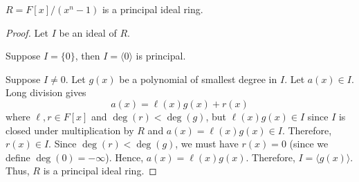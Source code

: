 \begin{thmbox}
    \begin{theorem}
        $ R=F[x]/(x^n-1) $ is a principal ideal ring.
    \end{theorem}
\end{thmbox}

\begin{proof}
    Let $ I $ be an ideal of $ R $.

    Suppose $ I=\{0\} $, then $ I=\langle 0\rangle $ is principal.

    Suppose $ I\neq 0 $. Let $ g(x) $ be a polynomial of smallest
    degree in $ I $. Let $ a(x)\in I $. Long division
    gives
    \[ a(x)=\ell(x)g(x)+r(x) \]
    where $ \ell,r\in F[x] $ and $ \deg(r)<\deg(g) $, but $ \ell(x)g(x)\in I $
    since $ I $ is closed under multiplication by $ R $ and
    $ a(x)=\ell(x)g(x)\in I $. Therefore, $ r(x)\in I $.
    Since $ \deg(r) <\deg(g) $, we must have $ r(x)=0 $ (since we define
    $ \deg(0)=-\infty $). Hence, $ a(x)=\ell(x)g(x) $. Therefore,
    $ I=\langle g(x) \rangle $. Thus, $ R $ is a principal ideal ring.
\end{proof}

